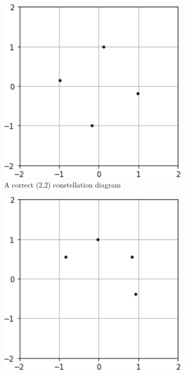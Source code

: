 \documentclass[12pt,onecolumn,letterpaper]{article}
\begin{document}
\begin{figure}[t!]
   \centering
   \begin{subfigure}[t]{0.2\textwidth}
       \centering
       \includegraphics[width=\linewidth]{figures/l2_ae_inconsistent1.png}
       \caption{A correct (2,2) constellation diagram}
   \end{subfigure}
   \hfill
   \begin{subfigure}[t]{0.2\textwidth}
       \centering
       \includegraphics[width=\linewidth]{figures/l2_ae_inconsistent2.png}

\end{subfigure}
\end{figure}
\end{document}
